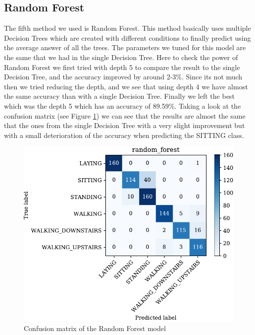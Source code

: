 \documentclass[conference,a4paper]{IEEEtran}
\begin{document}
\subsection{Random Forest}
The fifth method we used is Random Forest. This method basically uses multiple Decision Trees which are created with different conditions to finally predict using the average answer of all the trees. The parameters we tuned for this model are the same that we had in the single Decision Tree. Here to check the power of Random Forest we first tried with depth 5 to compare the result to the single Decision Tree, and the accuracy improved by around 2-3\%. Since its not much then we tried reducing the depth, and we see that using depth 4 we have almost the same accuracy than with a single Decision Tree. Finally we left the best which was the depth 5 which has an accuracy of 89.59\%. Taking a look at the confusion matrix (see Figure \ref{fig:cm_rf}) we can see that the results are almost the same that the ones from the single Decision Tree with a very slight improvement but with a small deterioration of the accuracy when predicting the SITTING class.

\begin{figure}[htbp]
    \centering
    \includegraphics[width=0.8\columnwidth]{../plots/cm_random_forest.pdf}
    \caption{Confusion matrix of the Random Forest model}
    \label{fig:cm_rf}
\end{figure}
\end{document}
